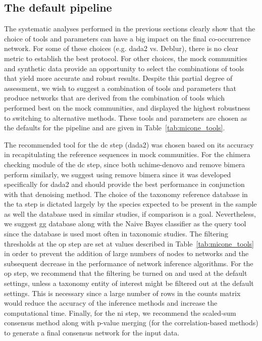   \FloatBarrier

  \subsection*{The default pipeline}

  The systematic analyses performed in the previous sections clearly show that the choice of tools and parameters can have a big impact on the final co-occurrence network.
  For some of these choices (e.g. \ac{dada2} vs. Deblur), there is no clear metric to establish the best protocol.
  For other choices, the mock communities and synthetic data provide an opportunity to select the combinations of tools that yield more accurate and robust results.
  Despite this partial degree of assessment, we wish to suggest a combination of tools and parameters that produce networks that are derived from the combination of tools which performed best on the mock communities, and displayed the highest robustness to switching to alternative methods.
  These tools and parameters are chosen as the defaults for the pipeline and are given in Table~\ref{tab:micone_tools}.

  The recommended tool for the \ac{dc} step (\ac{dada2}) was chosen based on its accuracy in recapitulating the reference sequences in mock communities.
  For the chimera checking module of the \ac{dc} step, since both uchime-denovo and remove bimera perform similarly, we suggest using remove bimera since it was developed specifically for \ac{dada2} and should provide the best performance in conjunction with that denoising method.
  The choice of the taxonomy reference database in the \ac{ta} step is dictated largely by the species expected to be present in the sample as well the database used in similar studies, if comparison is a goal.
  Nevertheless, we suggest \ac{gg} database along with the Naive Bayes classifier as the query tool since the database is used most often in taxonomic studies.
  The filtering thresholds at the \ac{op} step are set at values described in Table~\ref{tab:micone_tools} in order to prevent the addition of large numbers of nodes to networks and the subsequent decrease in the performance of network inference algorithms.
  For the \ac{op} step, we recommend that the filtering be turned on and used at the default settings, unless a taxonomy entity of interest might be filtered out at the default settings.
  This is necessary since a large number of rows in the counts matrix would reduce the accuracy of the inference methods and increase the computational time.
  Finally, for the \ac{ni} step, we recommend the scaled-sum consensus method along with p-value merging (for the correlation-based methods) to generate a final consensus network for the input data.

